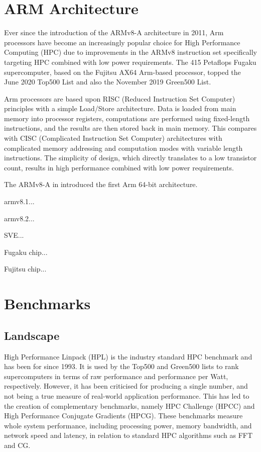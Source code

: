 %
%
\section{ARM Architecture}

Ever since the introduction of the ARMv8-A architecture in 2011, Arm processors have become an increasingly popular choice for High Performance Computing (HPC) due to improvements in the ARMv8 instruction set specifically targeting HPC combined with low power requirements. The 415 Petaflops Fugaku supercomputer, based on the Fujitsu AX64 Arm-based processor, topped the June 2020 Top500 List and also the November 2019 Green500 List.

Arm processors are based upon RISC (Reduced Instruction Set Computer) principles with a simple Load/Store architecture. Data is loaded from main memory into processor registers, computations are performed using fixed-length instructions, and the results are then stored back in main memory. This compares with CISC (Complicated Instruction Set Computer) architectures with complicated memory addressing and computation modes with variable length instructions. The simplicity of design, which directly translates to a low transistor count, results in high performance combined with low power requirements.

The ARMv8-A in introduced the first Arm 64-bit architecture.

armv8.1...

armv8.2...

SVE...

Fugaku chip...

Fujitsu chip... 


%
%
\section{Benchmarks}

\subsection{Landscape}

High Performance Linpack (HPL) is the industry standard HPC benchmark and has been for since 1993. It is used by the Top500 and Green500 lists to rank supercomputers in terms of raw performance and performance per Watt, respectively. However, it has been criticised for producing a single number, and not being a true measure of real-world application performance. This has led to the creation of complementary benchmarks, namely HPC Challenge (HPCC) and High Performance Conjugate Gradients (HPCG). These benchmarks measure whole system performance, including processing power, memory bandwidth, and network speed and latency, in relation to standard HPC algorithms such as FFT and CG.



